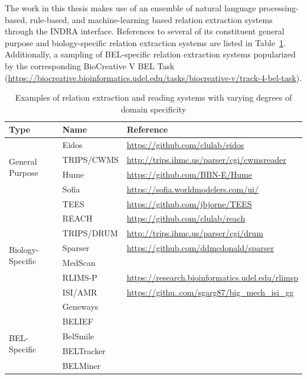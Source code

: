 The work in this thesis makes use of an ensemble of natural language processing-based, rule-based, and machine-learning based relation extraction systems through the \ac{INDRA} interface.
References to several of its constituent general purpose and biology-specific relation extraction systems are listed in Table~\ref{table:relation_extraction_systems}.
Additionally, a sampling of BEL-specific relation extraction systems popularized by the corresponding BioCreative V BEL Task (\url{https://biocreative.bioinformatics.udel.edu/tasks/biocreative-v/track-4-bel-task}).


\begin{table}
    \centering
    \begin{tabular}{ l l l }
        Type & Name & Reference \\
        \hline
        \multirow{4}{*}{General Purpose} & Eidos & \url{https://github.com/clulab/eidos} \\
        & TRIPS/CWMS & \url{http://trips.ihmc.us/parser/cgi/cwmsreader} \\
        & Hume & \url{https://github.com/BBN-E/Hume} \\
        & Sofia & \url{https://sofia.worldmodelers.com/ui/} \\
        \hline
        \multirow{8}{*}{Biology-Specific} & \ac{TEES} & \url{https://github.com/jbjorne/TEES} \\
        & \ac{REACH} & \url{https://github.com/clulab/reach} \\
        & TRIPS/DRUM & \url{http://trips.ihmc.us/parser/cgi/drum} \\
        & Sparser & \url{https://github.com/ddmcdonald/sparser} \\
        & MedScan &\cite{Novichkova2003} \\
        & RLIMS-P & \url{https://research.bioinformatics.udel.edu/rlimsp}  \\
        & ISI/AMR & \url{https://githu..com/sgarg87/big_mech_isi_gg} \\
        & Geneways &\cite{Rzhetsky2004} \\
        \hline
        \multirow{4}{*}{\ac{BEL}-Specific} & \ac{BELIEF} &\cite{Madan2016} \\
        & BelSmile &\cite{Lai2016} \\
        & BELTracker &\cite{Rastegar-Mojarad2016} \\
        & BELMiner &\cite{Ravikumar2017} \\
    \end{tabular}
    \caption{Examples of relation extraction and reading systems with varying degrees of domain specificity}
    \label{table:relation_extraction_systems}
\end{table}

